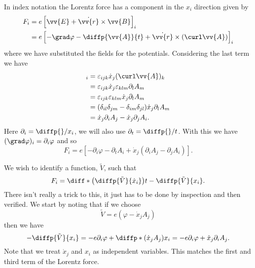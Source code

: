 \documentclass[fleqn]{NotesClass}
\begin{document}
    In index notation the Lorentz force has a component in the \(x_i\) direction given by
    \begin{align}
        F_i &= e\left[ \vv{E} + \dot{\vv{r}} \times \vv{B} \right]_i\\
        &= e\left[ -\grad\varphi - \diffp{\vv{A}}{t} + \dot{\vv{r}} \times (\curl \vv{A}) \right]_i
    \end{align}
    where we have substituted the fields for the potentials.
    Considering the last term we have
    \begin{align}
        [\dot{\vv{r}} \times (\curl \vv{A})]_i &= \varepsilon_{ijk}\dot{x}_j(\curl\vv{A})_k\\
        &= \varepsilon_{ijk}\dot{x}_j\varepsilon_{klm}\partial_lA_m\\
        &= \varepsilon_{ijk}\varepsilon_{klm}\dot{x}_j\partial_lA_m\\
        &= (\delta_{il}\delta_{jm} - \delta_{im}\delta_{jl})\dot{x}_j\partial_lA_m\\
        &= \dot{x}_j\partial_iA_j - \dot{x}_j\partial_jA_i.
    \end{align}
    Here \(\partial_i = \diffp{}/{x_i}\), we will also use \(\partial_t = \diffp{}/{t}\).
    With this we have \((\grad\varphi)_i = \partial_i\varphi\) and so
    \begin{equation}
        F_i = e\left[ -\partial_i\varphi - \partial_tA_i + \dot{x}_j(\partial_iA_j - \partial_jA_i) \right].
    \end{equation}
    
    We wish to identify a function, \(\tilde{V}\), such that
    \begin{equation}
        F_i = \diff*{\left( \diffp{\tilde{V}}{\dot{x}_i} \right)}{t} - \diffp{\tilde{V}}{x_i}.
    \end{equation}
    There isn't really a trick to this, it just has to be done by inspection and then verified.
    We start by noting that if we choose
    \begin{equation}
        \tilde{V} = e(\varphi - \dot{x}_jA_j)
    \end{equation}
    then we have
    \begin{equation}
        -\diffp{\tilde{V}}{x_i} = -e\partial_i\varphi + \diffp*{(\dot{x}_jA_j)}{x_i} = -e\partial_i\varphi + \dot{x}_j\partial_iA_j.
    \end{equation}
    Note that we treat \(\dot{x}_j\) and \(x_i\) as independent variables.
    This matches the first and third term of the Lorentz force.
    
\end{document}
